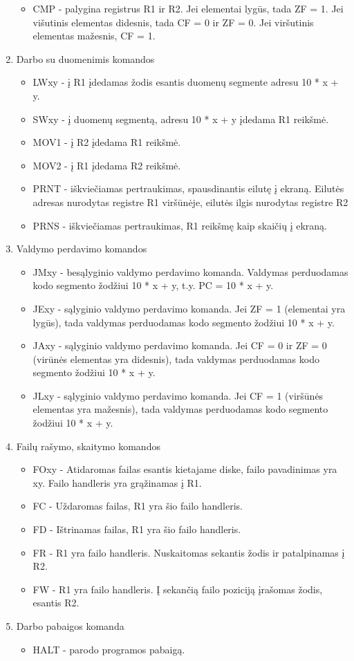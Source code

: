 \begin{enumerate}
		\begin{itemize}
		\item CMP - palygina registrus R1 ir R2. Jei elementai lygūs, tada ZF = 1. Jei višutinis elementas didesnis, tada CF = 0 ir  ZF = 0. Jei viršutinis elementas mažesnis, CF = 1.
		\end{itemize}
	\item Darbo su duomenimis komandos
		\begin{itemize}
		\item LWxy - į R1 įdedamas žodis esantis duomenų segmente adresu 10 * x + y.
		\item SWxy - į duomenų segmentą, adresu 10 * x + y įdedama R1 reikšmė.
		\item MOV1 - į R2 įdedama R1 reikšmė.
		\item MOV2 - į R1 įdedama R2 reikšmė.
		\item PRNT - iškviečiamas pertraukimas, spausdinantis eilutę į ekraną. Eilutės adresas nurodytas registre R1 viršūnėje, eilutės ilgis nurodytas registre R2
		\item PRNS - iškviečiamas pertraukimas, R1 reikšmę kaip skaičių į ekraną.
		\end{itemize}
	\item Valdymo perdavimo komandos
		\begin{itemize}
		\item JMxy - besąlyginio valdymo perdavimo komanda. Valdymas perduodamas kodo segmento žodžiui 10 * x + y, t.y. PC = 10 * x + y.
		\item JExy - sąlyginio valdymo perdavimo komanda. Jei ZF = 1 (elementai yra lygūs), tada valdymas perduodamas kodo segmento žodžiui 10 * x + y.
		\item JAxy - sąlyginio valdymo perdavimo komanda. Jei CF = 0 ir ZF = 0 (virūnės elementas yra didesnis), tada valdymas perduodamas kodo segmento žodžiui 10 * x + y.
		\item JLxy  - sąlyginio valdymo perdavimo komanda. Jei CF = 1 (viršūnės elementas yra mažesnis), tada valdymas perduodamas kodo segmento žodžiui 10 * x + y.
		\end{itemize}
	\item Failų rašymo, skaitymo komandos
		\begin{itemize}
		\item FOxy - Atidaromas failas esantis kietajame diske, failo pavadinimas yra xy. Failo handleris yra grąžinamas į R1.
		\item FC - Uždaromas failas, R1 yra šio failo handleris.
		\item FD - Ištrinamas failas, R1 yra šio failo handleris.
		\item FR - R1 yra failo handleris. Nuskaitomas sekantis žodis ir patalpinamas į R2.
		\item FW - R1 yra failo handleris. Į sekančią failo poziciją įrašomas žodis, esantis R2.
		\end{itemize}
	\item Darbo pabaigos komanda
		\begin{itemize}
		\item HALT - parodo programos pabaigą.
		\end{itemize}
	\end{enumerate}
